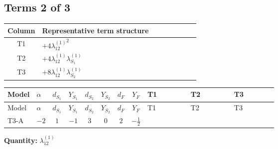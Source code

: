 \documentclass[8pt]{article}
\begin{document}
\begin{landscape}
\subsection*{Terms 2 of 3}
\begin{center}
\begin{tabular}{@{}c >{\raggedright\arraybackslash}p{0.82\linewidth}@{}}
\toprule
Column & Representative term structure \\
\midrule
T1 & \(\displaystyle +4 {\lambda_{12}^{(1)}}^2\) \\
\midrule
T2 & \(\displaystyle +4 {\lambda_{12}^{(1)}} {\lambda_{S_1}^{(1)}}\) \\
\midrule
T3 & \(\displaystyle +8 {\lambda_{12}^{(1)}} {\lambda_{S_2}^{(1)}}\) \\
\midrule
\bottomrule
\end{tabular}
\end{center}
\smallskip
\tiny
\begin{longtable}{@{}llcccccc >{\raggedright\arraybackslash}p{0.21\linewidth} >{\raggedright\arraybackslash}p{0.21\linewidth} >{\raggedright\arraybackslash}p{0.21\linewidth}@{}}
\toprule
Model & $\alpha$ & $d_{S_1}$ & $Y_{S_1}$ & $d_{S_2}$ & $Y_{S_2}$ & $d_F$ & $Y_F$ & T1 & T2 & T3 \\
\midrule
\endfirsthead
\toprule
Model & $\alpha$ & $d_{S_1}$ & $Y_{S_1}$ & $d_{S_2}$ & $Y_{S_2}$ & $d_F$ & $Y_F$ & T1 & T2 & T3 \\
\midrule
\endhead
T3-A & $-2$ & $1$ & $-1$ & $3$ & $0$ & $2$ & $-\frac{1}{2}$ & \scriptsize\adjustbox{max width=\linewidth}{$\begin{gathered} +4 {\lambda_{12}^{(1)}}^2\end{gathered}$} & \scriptsize\adjustbox{max width=\linewidth}{$\begin{gathered} +4 {\lambda_{12}^{(1)}} {\lambda_{S_1}^{(1)}}\end{gathered}$} & \scriptsize\adjustbox{max width=\linewidth}{$\begin{gathered} +8 {\lambda_{12}^{(1)}} {\lambda_{S_2}^{(1)}}\end{gathered}$} \\
\midrule
\bottomrule
\end{longtable}
\clearpage
\noindent\textbf{Quantity: }$\lambda_{12}^{(1)}$\par\smallskip

\end{landscape}
\end{document}
